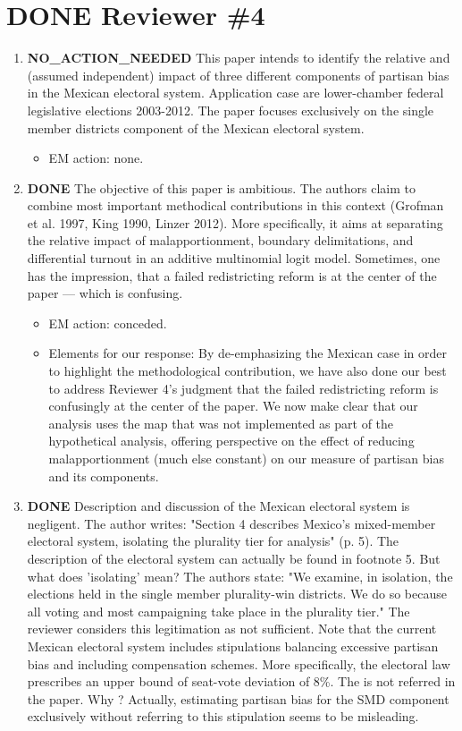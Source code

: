 \documentclass{article}
\begin{document}
\section{{\bfseries\sffamily DONE} Reviewer \#4}
\label{sec:orgheadline30}
\begin{enumerate}
\item {\bfseries\sffamily NO\_ACTION\_NEEDED} This paper intends to identify the relative and (assumed independent) impact of three different components of partisan bias  in the Mexican electoral system. Application case are lower-chamber federal legislative elections 2003-2012. The paper focuses exclusively on the single member districts  component of the Mexican electoral system.
\label{sec:orgheadline20}
\begin{itemize}
\item EM action: none.
\end{itemize}
\item {\bfseries\sffamily DONE} The objective of this paper is ambitious. The authors claim to combine most important methodical contributions in this context (Grofman et al. 1997, King 1990, Linzer 2012).  More specifically, it aims at separating the relative impact of malapportionment, boundary delimitations, and differential turnout in an additive multinomial logit model. Sometimes, one has the impression, that a failed redistricting reform is at the center of the paper --- which is confusing.
\label{sec:orgheadline21}
\begin{itemize}
\item EM action: conceded.
\item Elements for our response: By de-emphasizing the Mexican case in order to highlight the methodological contribution, we have also done our best to address Reviewer 4's judgment that the failed redistricting reform is confusingly at the center of the paper. We now make clear that our analysis  uses the map that was not implemented as part of the hypothetical analysis, offering perspective on the effect of reducing malapportionment (much else constant) on our measure of partisan bias and its components.
\end{itemize}
\item {\bfseries\sffamily DONE} Description and discussion of the Mexican electoral system is negligent. The author writes: "Section 4 describes Mexico's mixed-member electoral system, isolating the plurality tier for analysis" (p. 5). The description of the electoral system can actually be found in footnote 5. But  what does 'isolating' mean? The authors state: "We examine, in isolation, the elections held in the single member plurality-win districts. We do so because all voting and most campaigning take place in the plurality tier." The reviewer considers this legitimation as not sufficient. Note that the current Mexican electoral system includes stipulations balancing excessive partisan bias and including compensation schemes. More specifically, the electoral law prescribes an upper bound of seat-vote deviation of 8\%. The is not referred in the paper. Why ? Actually, estimating partisan bias for the SMD component exclusively without referring to this stipulation seems to be misleading.

\end{enumerate}
\end{document}
